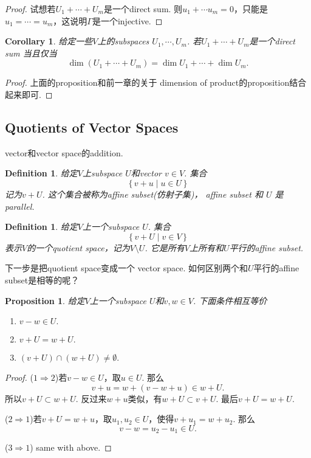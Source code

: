 \documentclass{article}
\newtheorem{corollary}[theorem]{Corollary}
\newtheorem{proposition}[theorem]{Proposition}
\newtheorem{definition}[theorem]{Definition}
\newcommand\Set[2]{\{\,#1\mid#2\,\}} %
\begin{document}
\begin{proof}
试想若$U_1 + \cdots + U_m$是一个direct sum. 则$u_1 + \cdots u_m = 0$，只能是$u_1 = \cdots = u_m$，这说明$\Gamma$是一个injective.
\end{proof}

\begin{corollary}
\rm 给定一些$V$上的subspaces $U_1,\cdots,U_m$. 若$U_1 + \cdots + U_m$是一个direct sum 当且仅当
$$
	\dim(U_1 + \cdots + U_m) = \dim U_1 + \cdots + \dim U_m.
$$
\end{corollary}

\begin{proof}
上面的proposition和前一章的关于 dimension of product的proposition结合起来即可.
\end{proof}

\newpage
\subsection{Quotients of Vector Spaces}


vector和vector space的addition.

\begin{definition}
\rm 给定$V$上subspace $U$和vector $v \in V$. 集合
$$
\Set{v+u}{u \in U}
$$
记为$v+U$. 这个集合被称为affine subset(仿射子集)， affine subset 和 $U$ 是parallel.
\end{definition}


\begin{definition}
\rm 给定$V$上一个subspace $U$. 集合
$$
\Set{v+U}{v \in V}
$$
表示$V$的一个quotient space，记为$V \setminus U$. 它是所有$V$上所有和$U$平行的affine subset.
\end{definition}

{\color{red} 下一步是把quotient space变成一个 vector space}. 如何区别两个和$U$平行的affine subset是相等的呢？

\begin{proposition}
\rm 给定$V$上一个subspace $U$和$v,w \in V$. 下面条件相互等价
\begin{enumerate}
	\item $v-w \in U.$
	\item $v+U = w+U.$
	\item $(v+U) \cap (w+U) \neq \emptyset.$
\end{enumerate}
\end{proposition}

\begin{proof}
($1 \Rightarrow 2$)若$v-w \in U$，取$u \in U$. 那么
$$
v + u  = w+(v-w+u) \in w+U.
$$
所以$v+U \subset w+U$. 反过来$w+u$类似，有$w+U \subset v+U$. 最后$v+U = w+U.$

($2 \Rightarrow 1$)若$v+U = w+u$，取$u_1,u_2 \in U$，使得$v+u_1 = w + u_2$. 那么
$$
v-w =u_2-u_1 \in U.
$$

($3 \Rightarrow 1$) same with above.
\end{proof}
\end{document}
